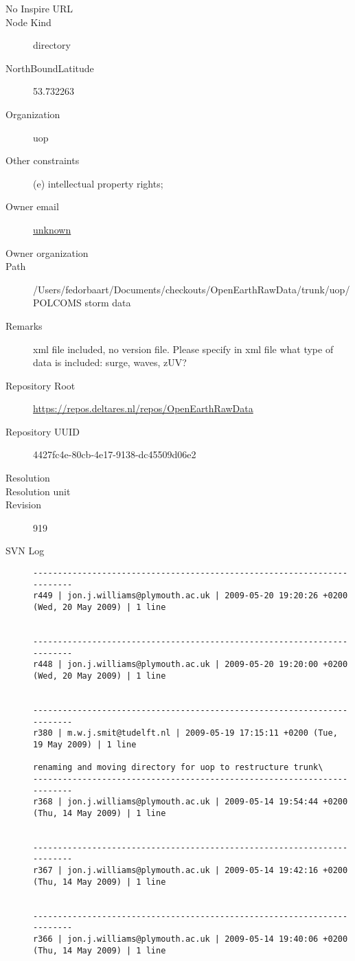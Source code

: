 \documentclass[9]{report}
\begin{document}
\begin{description}
  \item[No Inspire URL] 
  \item[Node Kind] directory
  \item[NorthBoundLatitude] 53.732263
  \item[Organization] uop
  \item[Other constraints] (e) intellectual property rights;
  \item[Owner email] \href{mailto:unknown}{unknown}
  \item[Owner organization] 
  \item[Path] /Users/fedorbaart/Documents/checkouts/OpenEarthRawData/trunk/uop/POLCOMS storm data
  \item[Remarks] xml file included, no version file. Please specify in xml file what type of data is included: surge, waves, zUV?
  \item[Repository Root] \href{https://repos.deltares.nl/repos/OpenEarthRawData}{https://repos.deltares.nl/repos/OpenEarthRawData}
  \item[Repository UUID] 4427fc4e-80cb-4e17-9138-dc45509d06e2
  \item[Resolution] 
  \item[Resolution unit] 
  \item[Revision] 919
  \item[SVN Log] \begin{verbatim}
------------------------------------------------------------------------
r449 | jon.j.williams@plymouth.ac.uk | 2009-05-20 19:20:26 +0200 (Wed, 20 May 2009) | 1 line


------------------------------------------------------------------------
r448 | jon.j.williams@plymouth.ac.uk | 2009-05-20 19:20:00 +0200 (Wed, 20 May 2009) | 1 line


------------------------------------------------------------------------
r380 | m.w.j.smit@tudelft.nl | 2009-05-19 17:15:11 +0200 (Tue, 19 May 2009) | 1 line

renaming and moving directory for uop to restructure trunk\
------------------------------------------------------------------------
r368 | jon.j.williams@plymouth.ac.uk | 2009-05-14 19:54:44 +0200 (Thu, 14 May 2009) | 1 line


------------------------------------------------------------------------
r367 | jon.j.williams@plymouth.ac.uk | 2009-05-14 19:42:16 +0200 (Thu, 14 May 2009) | 1 line


------------------------------------------------------------------------
r366 | jon.j.williams@plymouth.ac.uk | 2009-05-14 19:40:06 +0200 (Thu, 14 May 2009) | 1 line



\end{verbatim}
\end{description}
\end{document}
